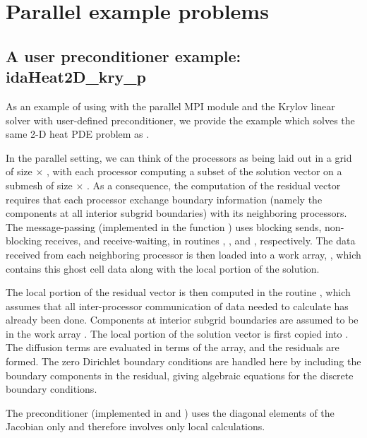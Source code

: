 \section{Parallel example problems}\label{s:ex_parallel}

\subsection{A user preconditioner example: idaHeat2D\_kry\_p}\label{ss:idaHeat2D_p}

As an example of using {\ida} with the parallel MPI {\nvecp} module and the Krylov 
linear solver {\sunlinsolspgmr} with user-defined preconditioner, we provide the example
 which solves the same 2-D heat PDE problem as . 

In the parallel setting, we can think of the processors as being laid out
in a grid of size  $\times$ , with each processor computing
a subset of the solution vector on a submesh of size  $\times$
.  As a consequence, the computation of the residual
vector requires that each processor exchange boundary information
(namely the components at all interior subgrid boundaries) with its
neighboring processors.  The message-passing (implemented in the
function ) uses blocking sends, non-blocking receives, and
receive-waiting, in routines , , and
, respectively.  The data received from each neighboring
processor is then loaded into a work array, , which contains
this ghost cell data along with the local portion of the solution.

The local portion of the residual vector is then computed in the
routine , which assumes that all inter-processor
communication of data needed to calculate  has already been
done.  Components at interior subgrid boundaries are assumed to be in
the work array .  The local portion of the solution vector
 is first copied into .  The diffusion terms are
evaluated in terms of the  array, and the residuals are
formed.  The zero Dirichlet boundary conditions are handled here by
including the boundary components in the residual, giving algebraic
equations for the discrete boundary conditions.

The preconditioner (implemented in  and ) uses the
diagonal elements of the Jacobian only and therefore involves only local calculations.


